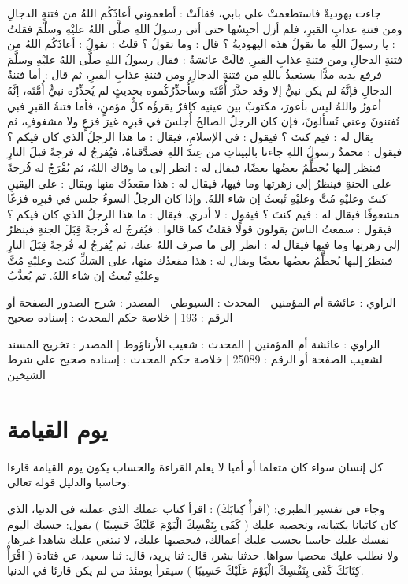 جاءت يهوديةٌ فاستطعمتْ على بابي، فقالَتْ : أطعموني أعاذَكُم اللهُ من فتنةِ الدجالِ ومن فتنةِ عذابِ القبرِ، فلم أزل أحبِسُها حتى أتى رسولُ اللهِ صلَّى اللهُ عليْهِ وسلَّمَ فقلتُ : يا رسولَ اللهِ ما تقولُ هذه اليهوديةُ ؟ قال : وما تقولُ ؟ قلتُ : تقولُ : أعاذَكُم اللهُ من فتنةِ الدجالِ ومن فتنةِ عذابِ القبرِ. قالَتْ عائشةُ : فقال رسولُ اللهِ صلَّى اللهُ عليْهِ وسلَّمَ فرفع يديه مدًّا يستعيذُ باللهِ من فتنةِ الدجالِ ومن فتنةِ عذابِ القبرِ، ثم قال : أما فتنةُ الدجالِ فإنَّهُ لم يكن نبيٌّ إلا وقد حذَّرَ أُمَّتَه وسأُحذِّرُكُموه بحديثٍ لم يُحذِّرُه نبيٌّ أُمَّتَه، إنَّهُ أعورُ واللهُ ليس بأعورَ، مكتوبٌ بين عينيه كافرٌ يقرؤُه كلُّ مؤمنٍ، فأما فتنةُ القبرِ فبي تُفتنونَ وعني تُسألونَ، فإن كان الرجلُ الصالحُ أُجلسَ في قبرِه غيرَ فزعٍ ولا مشغوفٍ، ثم يقال له : فيم كنتَ ؟ فيقول : في الإسلامِ، فيقال : ما هذا الرجلُ الذي كان فيكم ؟ فيقول : محمدٌ رسولُ اللهِ جاءنا بالبيناتِ من عِندَ اللهِ فصدَّقناهُ، فيُفرجُ له فرجةً قبلَ النارِ فينظر إليها يُحطِّمُ بعضُها بعضًا، فيقال له : انظر إلى ما وقاك اللهُ، ثم يُفْرَجُ له فُرجةً على الجنةِ فينظرُ إلى زهرتها وما فيها، فيقال له : هذا مقعدُك منها ويقال : على اليقينِ كنتَ وعليْهِ مُتَّ وعليْهِ تُبعثُ إن شاء اللهُ. وإذا كان الرجلُ السوءُ جلس في قبرِه فزعًا مشعوفًا فيقال له : فيم كنتَ ؟ فيقول : لا أدري. فيقال : ما هذا الرجلُ الذي كان فيكم ؟ فيقول : سمعتُ الناسَ يقولون قولًا فقلتُ كما قالوا : فيُفرجُ له فُرجةً قِبَلَ الجنةِ فينظرُ إلى زهرتِها وما فيها فيقال له : انظر إلى ما صرف اللهُ عنك، ثم يُفرجُ له فُرجةً قِبَلَ النارِ فينظرُ إليها يُحطِّمُ بعضُها بعضًا ويقال له : هذا مقعدُك منها، على الشكِّ كنتَ وعليْهِ مُتَّ وعليْهِ تُبعثُ إن شاء اللهُ. ثم يُعذَّبُ

الراوي : عائشة أم المؤمنين | المحدث : السيوطي | المصدر : شرح الصدور
الصفحة أو الرقم : 193 | خلاصة حكم المحدث : إسناده صحيح 

الراوي : عائشة أم المؤمنين | المحدث : شعيب الأرناؤوط | المصدر : تخريج المسند لشعيب
الصفحة أو الرقم : 25089 | خلاصة حكم المحدث : إسناده صحيح على شرط الشيخين 

\section{يوم القيامة}

كل إنسان سواء كان متعلما أو أميا لا يعلم القراءة والحساب يكون يوم القيامة قارءا وحاسبا والدليل قوله تعالى: 

\quranayah*[17][13-14]{\footnotesize \surahname*[17]}

وجاء في تفسير الطبري: 
(اقرأْ كِتابَكَ) : اقرأ كتاب عملك الذي عملته في الدنيا، الذي كان كاتبانا يكتبانه، ونحصيه عليك ( كَفَى بِنَفْسِكَ الْيَوْمَ عَلَيْكَ حَسِيبًا ) يقول: حسبك اليوم نفسك عليك حاسبا يحسب عليك أعمالك، فيحصيها عليك، لا نبتغي عليك شاهدا غيرها، ولا نطلب عليك محصيا سواها. حدثنا بشر، قال: ثنا يزيد، قال: ثنا سعيد، عن قتادة ( اقْرَأْ كِتَابَكَ كَفَى بِنَفْسِكَ الْيَوْمَ عَلَيْكَ حَسِيبًا ) سيقرأ يومئذ من لم يكن قارئا في الدنيا.

